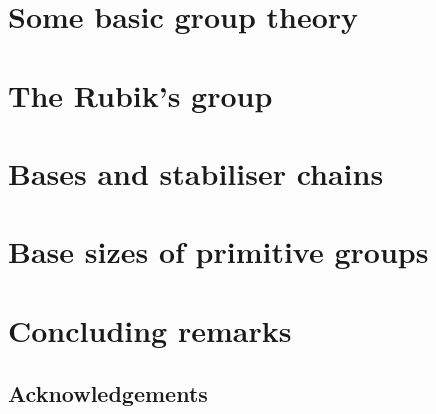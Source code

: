 \documentclass{beamer}
\begin{document}
\section{Some basic group theory}



\section{The Rubik's group}



\section{Bases and stabiliser chains}



\section{Base sizes of primitive groups}



\section{Concluding remarks}

\subsection{Acknowledgements}
\end{document}
